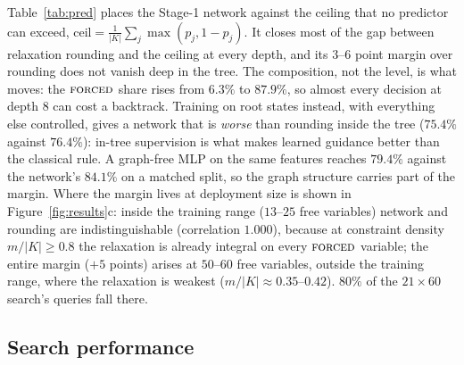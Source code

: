 \documentclass[final,5p,times,twocolumn]{elsarticle}
\newcommand{\FORCED}{\textsc{forced}}
\begin{document}
Table~\ref{tab:pred} places the Stage-1 network against the ceiling that no predictor can exceed, $\text{ceil}=\frac1{|K|}\sum_j\max(p_j,1-p_j)$. It closes most of the gap between relaxation rounding and the ceiling at every depth, and its $3$--$6$ point margin over rounding does not vanish deep in the tree. The composition, not the level, is what moves: the $\FORCED$ share rises from $6.3\%$ to $87.9\%$, so almost every decision at depth $8$ can cost a backtrack. Training on root states instead, with everything else controlled, gives a network that is \emph{worse} than rounding inside the tree ($75.4\%$ against $76.4\%$): in-tree supervision is what makes learned guidance better than the classical rule. A graph-free MLP on the same features reaches $79.4\%$ against the network's $84.1\%$ on a matched split, so the graph structure carries part of the margin. Where the margin lives at deployment size is shown in Figure~\ref{fig:results}c: inside the training range ($13$--$25$ free variables) network and rounding are indistinguishable (correlation $1.000$), because at constraint density $m/|K|\ge0.8$ the relaxation is already integral on every $\FORCED$ variable; the entire margin ($+5$ points) arises at $50$--$60$ free variables, outside the training range, where the relaxation is weakest ($m/|K|\approx0.35$--$0.42$). $80\%$ of the $21\times60$ search's queries fall there.

\subsection{Search performance}
\label{sec:exp-search}
\end{document}
